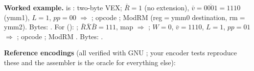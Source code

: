 \textbf{Worked example.}  is : two-byte VEX; $\bar R=1$ (no extension), $\bar{v} = \overline{0001} = 1110$ (ymm1), $L=1$, $pp=00$ $\Rightarrow$ ; opcode ; ModRM  (reg$=$ymm0 destination, rm$=$ymm2). Bytes: . For  (): ; $\bar R\bar X\bar B = 111$, map  $\Rightarrow$ ; $W=0$, $\bar v = 1110$, $L=1$, $pp=01$ $\Rightarrow$ ; opcode ; ModRM . Bytes: .

\textbf{Reference encodings} (all verified with GNU ; your encoder tests reproduce these and the assembler is the oracle for everything else):

